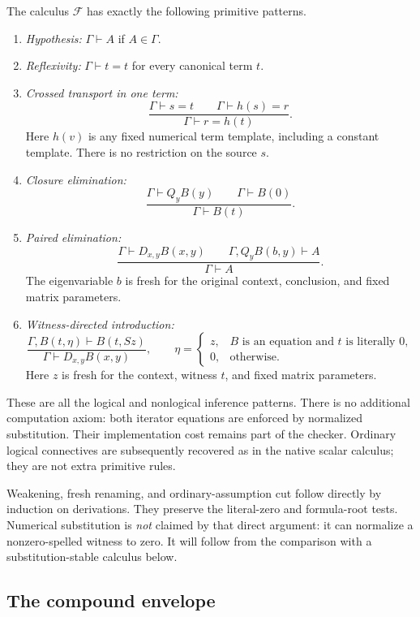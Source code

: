 The calculus $\mathcal F$ has exactly the following primitive patterns.
\begin{enumerate}
\item \emph{Hypothesis:} $\Gamma\vdash A$ if $A\in\Gamma$.
\item \emph{Reflexivity:} $\Gamma\vdash t=t$ for every canonical term $t$.
\item \emph{Crossed transport in one term:}
\[
 \frac{\Gamma\vdash s=t\qquad\Gamma\vdash h(s)=r}
      {\Gamma\vdash r=h(t)}.
 \tag{Tr}\label{env:tr}
\]
Here $h(v)$ is any fixed numerical term template, including a constant
template. There is no restriction on the source $s$.
\item \emph{Closure elimination:}
\[
 \frac{\Gamma\vdash Q_yB(y)\qquad\Gamma\vdash B(0)}
      {\Gamma\vdash B(t)}.
 \tag{QE}\label{env:qe}
\]
\item \emph{Paired elimination:}
\[
 \frac{\Gamma\vdash D_{x,y}B(x,y)\qquad
       \Gamma,Q_yB(b,y)\vdash A}{\Gamma\vdash A}.
 \tag{DE}\label{env:de}
\]
The eigenvariable $b$ is fresh for the original context, conclusion, and
fixed matrix parameters.
\item \emph{Witness-directed introduction:}
\[
 \frac{\Gamma,B(t,\eta)\vdash B(t,Sz)}
      {\Gamma\vdash D_{x,y}B(x,y)},\qquad
 \eta=\begin{cases}
 z,&B\text{ is an equation and }t\text{ is literally }0,\\
 0,&\text{otherwise}.
 \end{cases}
 \tag{WI}\label{env:wi}
\]
Here $z$ is fresh for the context, witness $t$, and fixed matrix parameters.
\end{enumerate}
These are all the logical and nonlogical inference patterns. There is no
additional computation axiom: both iterator equations are enforced by
normalized substitution. Their implementation cost remains part of the
checker. Ordinary logical connectives are subsequently recovered as in the
native scalar calculus; they are not extra primitive rules.

Weakening, fresh renaming, and ordinary-assumption cut follow directly by
induction on derivations. They preserve the literal-zero and formula-root
tests. Numerical substitution is \emph{not} claimed by that direct argument:
it can normalize a nonzero-spelled witness to zero. It will follow from the
comparison with a substitution-stable calculus below.

\subsection{The compound envelope}


